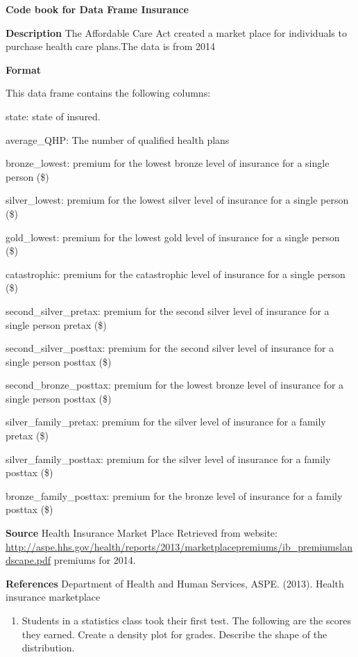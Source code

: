 \documentclass[]{book}
\providecommand{\tightlist}{%
  \setlength{\itemsep}{0pt}\setlength{\parskip}{0pt}}
\begin{document}
\textbf{Code book for Data Frame Insurance}

\textbf{Description}
The Affordable Care Act created a market place for individuals to
purchase health care plans.The data is from 2014

\textbf{Format}

This data frame contains the following columns:

state: state of insured.

average\_QHP: The number of qualified health plans

bronze\_lowest: premium for the lowest bronze level of insurance for a single person (\$)

silver\_lowest: premium for the lowest silver level of insurance for a single person (\$)

gold\_lowest: premium for the lowest gold level of insurance for a single person (\$)

catastrophic: premium for the catastrophic level of insurance for a single person (\$)

second\_silver\_pretax: premium for the second silver level of insurance for a single person pretax (\$)

second\_silver\_posttax: premium for the second silver level of insurance for a single person posttax (\$)

second\_bronze\_posttax: premium for the lowest bronze level of insurance for a single person posttax (\$)

silver\_family\_pretax: premium for the silver level of insurance for a family pretax (\$)

silver\_family\_posttax: premium for the silver level of insurance for a family posttax (\$)

bronze\_family\_posttax: premium for the bronze level of insurance for a family posttax (\$)

\textbf{Source}
Health Insurance Market Place Retrieved from website:
\url{http://aspe.hhs.gov/health/reports/2013/marketplacepremiums/ib_premiumslandscape.pdf}
premiums for 2014.

\textbf{References}
Department of Health and Human Services, ASPE. (2013). Health insurance marketplace

\begin{enumerate}
\def\labelenumi{\arabic{enumi}.}
\setcounter{enumi}{3}
\tightlist
\item
  Students in a statistics class took their first test. The following are the scores they earned. Create a density plot for grades. Describe the shape of the distribution.
\end{enumerate}
\end{document}
